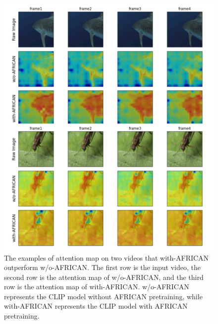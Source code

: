 \begin{figure}[ht]
    \centering
    \includegraphics[width=1.0\textwidth]{assets/charts/4_5_AttentionMaps_1}
    \caption[Attention Map 1 (Good examples)]{The examples of attention map on two videos that with-AFRICAN outperform w/o-AFRICAN. The first row is the input video, the second row is the attention map of w/o-AFRICAN, and the third row is the attention map of with-AFRICAN. w/o-AFRICAN represents the CLIP model without AFRICAN pretraining, while with-AFRICAN represents the CLIP model with AFRICAN pretraining.}
    \label{fig:attnmap1}
\end{figure}

